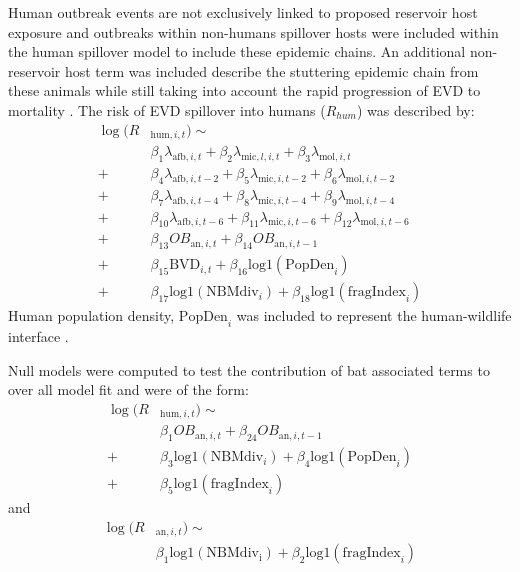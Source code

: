 \documentclass[9pt,twoside,lineno]{pnas-new}
\newcommand{\afb}{\mathrm{afb}}
\newcommand{\mic}{\mathrm{mic}}
\newcommand{\mol}{\mathrm{mol}}
\newcommand{\logplus}{\mathrm{log1}}
\begin{document}
Human outbreak events are not exclusively linked to proposed reservoir host exposure \cite{Pourrut2005TheAfrica} and outbreaks within non-humans spillover hosts were included within the human spillover model to include these epidemic chains. An additional non-reservoir host term was included describe the stuttering epidemic chain from these animals while still taking into account the rapid progression of EVD to mortality \cite{Swanepoel1996ExperimentalVirus}. The risk of EVD spillover into humans ($R_{hum}$) was described by:
\[
    \begin{split}
\log(R&_{\mathrm{hum}, i, t}) \sim \\
&\beta_1 \lambda_{\afb, i, t} + \beta_2 \lambda_{\mic, l, i, t} + \beta_3 \lambda_{\mol, i, t} \\
 + &\beta_4 \lambda_{\afb, i, t-2} + \beta_5 \lambda_{\mic, i, t-2} + \beta_6 \lambda_{\mol, i, t-2} \\
 + &\beta_7 \lambda_{\afb, i, t-4} + \beta_8 \lambda_{\mic, i, t-4} + \beta_9 \lambda_{\mol, i, t-4} \\
 + &\beta_{10} \lambda_{\afb, i, t-6} + \beta_{11} \lambda_{\mic, i, t-6} + \beta_{12} \lambda_{\mol, i, t-6} \\
 + &\beta_{13} OB_{\mathrm{an}, i, t} + \beta_{14} OB_{\mathrm{an},i, t-1}  \\
 +&\beta_{15} \mathrm{BVD}_{i,t} + \beta_{16} \logplus(\mathrm{PopDen}_{i})  \\
 + &\beta_{17} \logplus(\mathrm{NBM div}_{i}) + \beta_{18} \logplus(\mathrm{fragIndex}_{i})  
    \end{split}
\]
Human population density, $\mathrm{PopDen}_{i}$ was included to represent the human-wildlife interface \cite{Plowright2015EcologicalSpillover.}. \par

Null models were computed to test the contribution of bat associated terms to over all model fit and were of the form:
\[
\begin{split}
   \log(R&_{\mathrm{hum}, i, t}) \sim \\ 
   &\beta_{1} OB_{\mathrm{an}, i, t} + \beta_{24} OB_{\mathrm{an}, i, t-1}  \\
 +&\beta_{3} \logplus(\mathrm{NBM div}_{i}) + \beta_{4} \logplus(\mathrm{PopDen}_{i})  \\
 + &\beta_{5} \logplus(\mathrm{fragIndex}_{i})
\end{split}
\]
and 
\[
\begin{split}
   \log(R& _{\mathrm{an}, i, t}) \sim \\
   & \beta_1 \logplus(\mathrm{NBM div_i}) + \beta_2 \logplus(\mathrm{fragIndex}_{i})
\end{split}
\]
\end{document}
